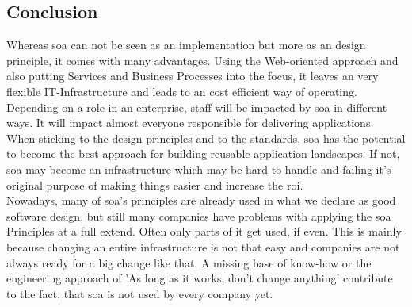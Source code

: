 \documentclass[12pt]{article}
\begin{document}
\subsection{Conclusion}
Whereas \gls{soa} can not be seen as an implementation but more as an design principle, it comes with many advantages. Using the Web-oriented approach and also putting Services and Business Processes into the focus, it leaves an very flexible IT-Infrastructure and leads to an cost efficient way of operating.\\
Depending on a role in an enterprise, staff will be impacted by \gls{soa} in different ways. It will impact almost everyone responsible for delivering applications. When sticking to the design principles and to the standards, \gls{soa} has the potential to become the best approach for building reusable application landscapes. If not, \gls{soa} may become an infrastructure which may be hard to handle and failing it's original purpose of making things easier and increase the \gls{roi}.\\
Nowadays, many of \gls{soa}'s principles are already used in what we declare as good software design, but still many companies have problems with applying the \gls{soa} Principles at a full extend. Often only parts of it get used, if even. This is mainly because changing an entire infrastructure is not that easy and companies are not always ready for a big change like that. A missing base of know-how or the engineering approach of 'As long as it works, don't change anything' contribute to the fact, that \gls{soa} is not used by every company yet.


\newpage
\end{document}
